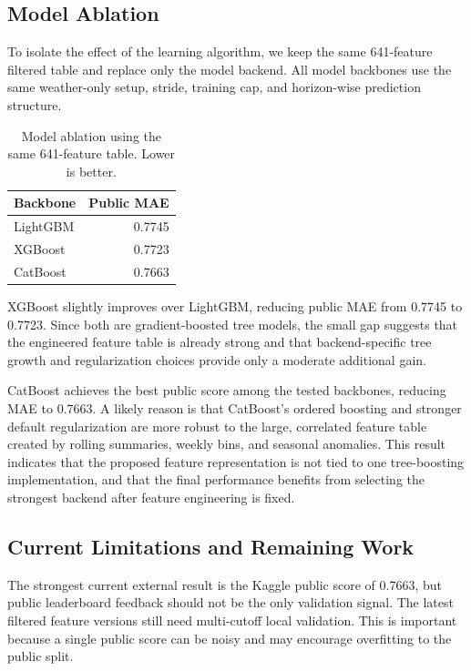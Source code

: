 \documentclass[conference]{IEEEtran}
\begin{document}
\subsection{Model Ablation}

To isolate the effect of the learning algorithm, we keep the same 641-feature
filtered table and replace only the model backend. All model backbones use the
same weather-only setup, stride, training cap, and horizon-wise prediction
structure.

\begin{table}[t]
\centering
\caption{Model ablation using the same 641-feature table. Lower is better.}
\label{tab:model_ablation}
\begin{tabular}{lr}
\toprule
Backbone & Public MAE \\
\midrule
LightGBM & 0.7745 \\
XGBoost & 0.7723 \\
CatBoost & 0.7663 \\
\bottomrule
\end{tabular}
\end{table}

XGBoost slightly improves over LightGBM, reducing public MAE from 0.7745 to
0.7723. Since both are gradient-boosted tree models, the small gap suggests that
the engineered feature table is already strong and that backend-specific tree
growth and regularization choices provide only a moderate additional gain.

CatBoost achieves the best public score among the tested backbones, reducing
MAE to 0.7663. A likely reason is that CatBoost's ordered boosting and stronger
default regularization are more robust to the large, correlated feature table
created by rolling summaries, weekly bins, and seasonal anomalies. This result
indicates that the proposed feature representation is not tied to one
tree-boosting implementation, and that the final performance benefits from
selecting the strongest backend after feature engineering is fixed.

\subsection{Current Limitations and Remaining Work}

The strongest current external result is the Kaggle public score of 0.7663, but
public leaderboard feedback should not be the only validation signal. The latest
filtered feature versions still need multi-cutoff local validation. This is
important because a single public score can be noisy and may encourage
overfitting to the public split.
\end{document}

